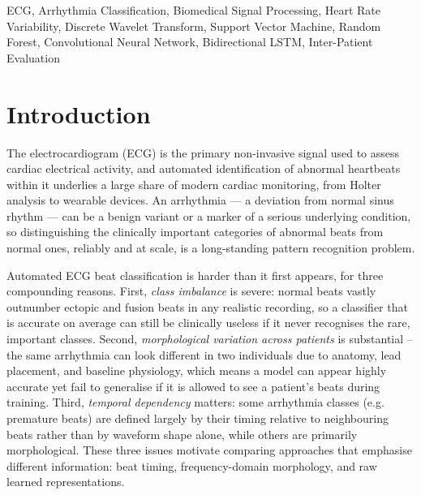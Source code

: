 \documentclass[conference]{IEEEtran}
\begin{document}
\begin{IEEEkeywords}
ECG, Arrhythmia Classification, Biomedical Signal Processing, Heart Rate
Variability, Discrete Wavelet Transform, Support Vector Machine, Random
Forest, Convolutional Neural Network, Bidirectional LSTM, Inter-Patient
Evaluation
\end{IEEEkeywords}

\section{Introduction}

The electrocardiogram (ECG) is the primary non-invasive signal used to
assess cardiac electrical activity, and automated identification of
abnormal heartbeats within it underlies a large share of modern cardiac
monitoring, from Holter analysis to wearable devices. An arrhythmia --- a
deviation from normal sinus rhythm --- can be a benign variant or a marker
of a serious underlying condition, so distinguishing the clinically
important categories of abnormal beats from normal ones, reliably and at
scale, is a long-standing pattern recognition problem.

Automated ECG beat classification is harder than it first appears, for
three compounding reasons. First, \textit{class imbalance} is severe:
normal beats vastly outnumber ectopic and fusion beats in any realistic
recording, so a classifier that is accurate on average can still be
clinically useless if it never recognises the rare, important classes.
Second, \textit{morphological variation across patients} is substantial --
the same arrhythmia can look different in two individuals due to anatomy,
lead placement, and baseline physiology, which means a model can appear
highly accurate yet fail to generalise if it is allowed to see a patient's
beats during training. Third, \textit{temporal dependency} matters: some
arrhythmia classes (e.g. premature beats) are defined largely by their
timing relative to neighbouring beats rather than by waveform shape alone,
while others are primarily morphological. These three issues motivate
comparing approaches that emphasise different information: beat timing,
frequency-domain morphology, and raw learned representations.
\end{document}
